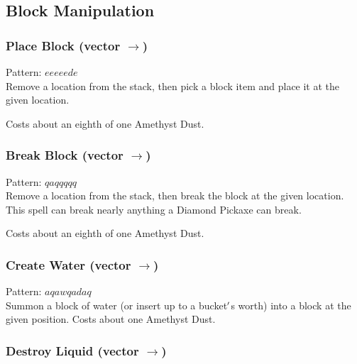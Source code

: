 \documentclass[12pt]{article}
\begin{document}
\newpage

\label{sec:patterns/spells/blockworks}
\subsection*{Block Manipulation}


  \label{sec: patterns/spells/blockworks@hexcasting:place_block}
\subsubsection*{Place Block (vector $\rightarrow$)}

    Pattern: $eeeeede$\\
      Remove a location from the stack, then pick a block item and place it at the given location.

Costs about an eighth of one Amethyst Dust.\\


  \label{sec: patterns/spells/blockworks@hexcasting:break_block}
\subsubsection*{Break Block (vector $\rightarrow$)}

    Pattern: $qaqqqqq$\\
      Remove a location from the stack, then break the block at the given location. This spell can break nearly anything a Diamond Pickaxe can break.

Costs about an eighth of one Amethyst Dust.\\


  \label{sec: patterns/spells/blockworks@hexcasting:create_water}
\subsubsection*{Create Water (vector $\rightarrow$)}

    Pattern: $aqawqadaq$\\
      Summon a block of water (or insert up to a bucket$\rq$s worth) into a block at the given position. Costs about one Amethyst Dust.\\


  \label{sec: patterns/spells/blockworks@hexcasting:destroy_water}
\subsubsection*{Destroy Liquid (vector $\rightarrow$)}
\end{document}
